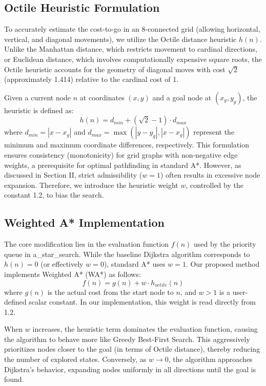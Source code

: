 \documentclass[conference]{IEEEtran}
\begin{document}
\subsection{Octile Heuristic Formulation}
To accurately estimate the cost-to-go in an 8-connected grid (allowing horizontal, vertical, and diagonal movements), we utilize the Octile distance heuristic $h(n)$. Unlike the Manhattan distance, which restricts movement to cardinal directions, or Euclidean distance, which involves computationally expensive square roots, the Octile heuristic accounts for the geometry of diagonal moves with cost $\sqrt{2}$ (approximately 1.414) relative to the cardinal cost of 1.

Given a current node $n$ at coordinates $(x, y)$ and a goal node at $(x_g, y_g)$, the heuristic is defined as:
\begin{equation}
    h(n) = d_{min} + (\sqrt{2} - 1) \cdot d_{max}
\end{equation}
where $d_{min} = |x - x_g|$ and $d_{max} = \max(|y - y_g|, |x - x_g|)$ represent the minimum and maximum coordinate differences, respectively. This formulation ensures consistency (monotonicity) for grid graphs with non-negative edge weights, a prerequisite for optimal pathfinding in standard A*. However, as discussed in Section II, strict admissibility ($w=1$) often results in excessive node expansion. Therefore, we introduce the heuristic weight $w$, controlled by the constant 1.2, to bias the search.

\subsection{Weighted A* Implementation}
The core modification lies in the evaluation function $f(n)$ used by the priority queue in a\_star\_search. While the baseline Dijkstra algorithm corresponds to $h(n)=0$ (or effectively $w=0$), standard A* uses $w=1$. Our proposed method implements Weighted A* (WA*) as follows:
\begin{equation}
    f(n) = g(n) + w \cdot h_{octile}(n)
\end{equation}
where $g(n)$ is the actual cost from the start node to $n$, and $w > 1$ is a user-defined scalar constant. In our implementation, this weight is read directly from 1.2. 

When $w$ increases, the heuristic term dominates the evaluation function, causing the algorithm to behave more like Greedy Best-First Search. This aggressively prioritizes nodes closer to the goal (in terms of Octile distance), thereby reducing the number of explored states. Conversely, as $w \to 0$, the algorithm approaches Dijkstra's behavior, expanding nodes uniformly in all directions until the goal is found.
\end{document}
